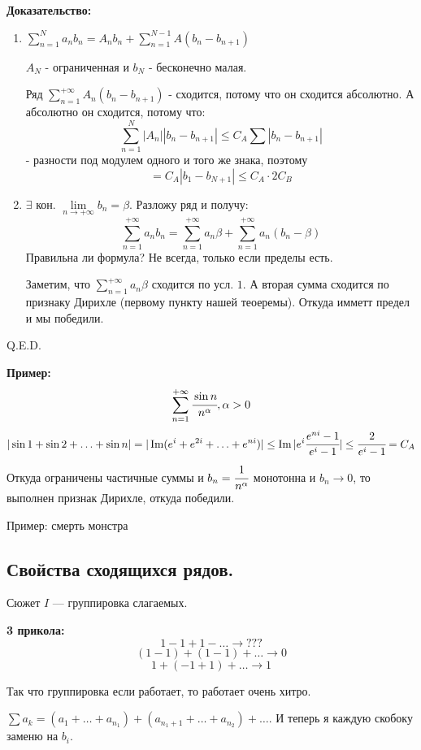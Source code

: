 \textbf{Доказательство:}

\begin{enumerate}
    \item $\sum\limits_{n=1}^N a_n b_n =A_n b_n + \sum\limits_{n=1}^{N-1} A(b_n-b_{n+1})$

$A_N$ - ограниченная и $b_N$ - бесконечно малая.

Ряд $\sum\limits_{n=1}^{+\infty} A_n (b_n-b_{n+1})$ - сходится, потому что он сходится абсолютно. А абсолютно он сходится, потому что:
$$\sum\limits_{n=1}^N |A_n||b_n-b_{n+1}|\leq C_A \sum|b_n-b_{n+1}|$$
- разности под модулем одного и того же знака, поэтому 
$$= C_A|b_1-b_{N+1}|\leq C_A \cdot 2 C_B$$
\item
$\exists$ кон. $\lim\limits_{n\rightarrow + \infty} b_n =\beta$. Разложу ряд и получу: $$\sum\limits_{n=1}^{+\infty}a_n b_n = \sum\limits_{n=1}^{+\infty} a_n \beta + \sum\limits_{n=1}^{+\infty}a_n(b_n-\beta)$$
Правильна ли формула? Не всегда, только если пределы есть.

Заметим, что $\sum\limits_{n=1}^{+\infty}a_n \beta$ сходится по усл. $1$. А вторая сумма сходится по признаку Дирихле (первому пункту нашей теоеремы). Откуда имметт предел и мы победили.
\end{enumerate}

\hfill Q.E.D.

\textbf{Пример:}
$$\sum\limits_{n=1}^{+\infty}\cfrac{\sin n}{n^{\alpha}}, \alpha >0$$
$$|\sin 1 + \sin 2+ \ldots + \sin n| = |\Im (e^i + e^{2i} + \ldots + e^{ni})| \leq \Im |e^i\cfrac{e^{ni}-1}{e^i-1}| \leq \cfrac{2}{e^{i}-1} = C_A$$
Откуда ограничены частичные суммы и $b_n = \cfrac{1}{n^{\alpha}}$ монотонна и $b_n\rightarrow 0 $, то выполнен признак Дирихле, откуда победили.

Пример: смерть монстра  %

\pagebreak
\subsection{Свойства сходящихся рядов.}

Сюжет $I$ --- группировка слагаемых.

\textbf{3 прикола:}
$$1- 1 + 1 -\ldots \rightarrow ???$$
$$(1-1)+(1-1) + \ldots \rightarrow 0$$
$$1 + (-1 + 1) + \ldots \rightarrow 1$$

Так что группировка если работает, то работает очень хитро.

$\sum a_k = (a_1 + \ldots + a_{n_1}) + (a_{n_1+1}+\ldots + a_{n_2})+\ldots$. И теперь я каждую скобоку заменю на $b_i$. 


